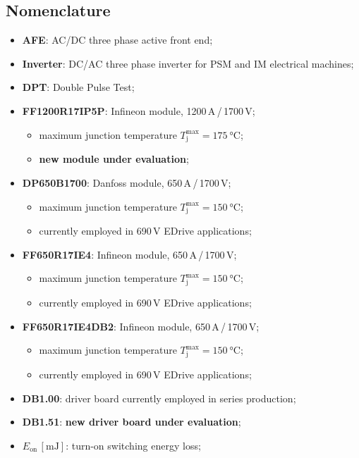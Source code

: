 \documentclass[12pt,a4paper]{scrartcl}
\begin{document}
\subsection*{Nomenclature}
\begin{itemize}
	\item[--] \textbf{AFE}: AC/DC three phase active front end;
	\item[--] \textbf{Inverter}: DC/AC three phase inverter for PSM and IM electrical machines;
	\item[--] \textbf{DPT}: Double Pulse Test;
	\item[--] \textbf{FF1200R17IP5P}: Infineon module, 1200\,A\,/\,1700\,V;
	\begin{itemize}
		\item[--] maximum junction temperature $T_\text{j}^\text{max} = \SI{175}{\celsius}$;
		\item[--] \textbf{new module under evaluation};
	\end{itemize}
	\item[--] \textbf{DP650B1700}: Danfoss module, 650\,A\,/\,1700\,V;
	\begin{itemize}
		\item[--] maximum junction temperature $T_\text{j}^\text{max} = \SI{150}{\celsius}$;
		\item[--] currently employed in 690\,V EDrive applications;
	\end{itemize}
	\item[--] \textbf{FF650R17IE4}: Infineon module, 650\,A\,/\,1700\,V;
	\begin{itemize}
		\item[--] maximum junction temperature $T_\text{j}^\text{max} = \SI{150}{\celsius}$;
		\item[--] currently employed in 690\,V EDrive applications;
	\end{itemize}
	\item[--] \textbf{FF650R17IE4DB2}: Infineon module, 650\,A\,/\,1700\,V;
	\begin{itemize}
		\item[--] maximum junction temperature $T_\text{j}^\text{max} = \SI{150}{\celsius}$;
		\item[--] currently employed in 690\,V EDrive applications;
	\end{itemize}
	\item[--] \textbf{DB1.00}: driver board currently employed in series production;
	\item[--] \textbf{DB1.51}: \textbf{new driver board under evaluation};
	\item[--] $E_\text{on}$\,$\left[\si{\milli\joule}\right]$: turn-on switching energy loss;

\end{itemize}
\end{document}
